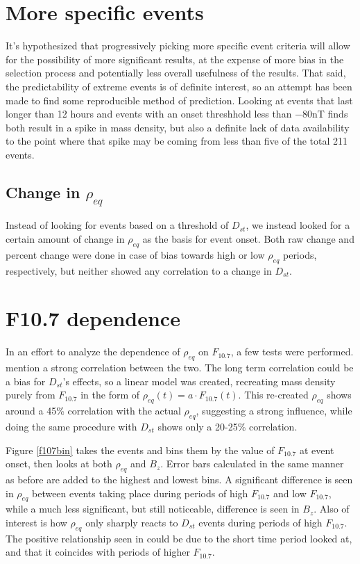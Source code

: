 \documentclass[10pt,twocolumn]{article}
\begin{document}
\section{More specific events}
It's hypothesized that progressively picking more specific event criteria will allow for the possibility of more significant results, at the expense of more bias in the selection process and potentially less overall usefulness of the results. That said, the predictability of extreme events is of definite interest, so an attempt has been made to find some reproducible method of prediction. Looking at events that last longer than 12 hours and events with an onset threshhold less than $-80$nT finds both result in a spike in mass density, but also a definite lack of data availability to the point where that spike may be coming from less than five of the total 211 events. 

\subsection{Change in $\rho_{eq}$}
Instead of looking for events based on a threshold of $D_{st}$, we instead looked for a certain amount of change in $\rho_{eq}$ as the basis for event onset. Both raw change and percent change were done in case of bias towards high or low $\rho_{eq}$ periods, respectively, but neither showed any correlation to a change in $D_{st}$. 

\section{F10.7 dependence}
In an effort to analyze the dependence of $\rho_{eq}$ on $F_{10.7}$, a few tests were performed. \cite{Takahashi2010} mention a strong correlation between the two. The long term correlation could be a bias for $D_{st}$'s effects, so a linear model was created, recreating mass density purely from $F_{10.7}$ in the form of $\rho_{eq}(t)=a\cdot F_{10.7}(t)$. This re-created $\rho_{eq}$ shows around a 45\% correlation with the actual $\rho_{eq}$, suggesting a strong influence, while doing the same procedure with $D_{st}$ shows only a 20-25\% correlation. 

Figure \ref{f107bin} takes the events and bins them by the value of $F_{10.7}$ at event onset, then looks at both $\rho_{eq}$ and $B_z$. Error bars calculated in the same manner as before are added to the highest and lowest bins. A significant difference is seen in $\rho_{eq}$ between events taking place during periods of high $F_{10.7}$ and low $F_{10.7}$, while a much less significant, but still noticeable, difference is seen in $B_z$. Also of interest is how $\rho_{eq}$ only sharply reacts to $D_{st}$ events during periods of high $F_{10.7}$. The positive relationship seen in \cite{Takahashi2010} could be due to the short time period looked at, and that it coincides with periods of higher $F_{10.7}$.
\end{document}
